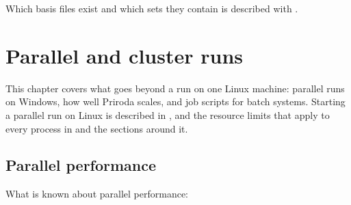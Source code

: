 \documentclass[letterpaper,10pt,english,openany,oneside]{sphinxmanual}
\begin{document}
\sphinxAtStartPar
Which basis files exist and which sets they contain is described with {\hyperref[\detokenize{reference/control:control-basis}]{}}.

\sphinxstepscope


\chapter{Parallel and cluster runs}
\label{\detokenize{start/parallel:parallel-and-cluster-runs}}\label{\detokenize{start/parallel:start-parallel}}\label{\detokenize{start/parallel::doc}}
\sphinxAtStartPar
This chapter covers what goes beyond a run on one Linux machine: parallel runs on Windows, how well Priroda scales,
and job scripts for batch systems. Starting a parallel run on Linux is described in {\hyperref[\detokenize{start/running::doc}]{}}, and the
resource limits that apply to every process in {\hyperref[\detokenize{start/running:running-ram-disk}]{}} and the sections around it.


\section{Parallel performance}
\label{\detokenize{start/parallel:parallel-performance}}\label{\detokenize{start/parallel:running-parallel-scaling}}
\sphinxAtStartPar
What is known about parallel performance:
\end{document}
